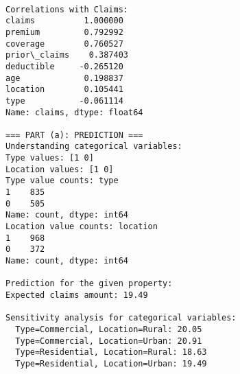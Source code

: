 \documentclass[8pt, twocolumn]{extarticle}
\begin{document}
    { \hspace*{\fill} \\}
    \begin{Verbatim}[commandchars=\\\{\}]
Correlations with Claims:
claims          1.000000
premium         0.792992
coverage        0.760527
prior\_claims    0.387403
deductible     -0.265120
age             0.198837
location        0.105441
type           -0.061114
Name: claims, dtype: float64

=== PART (a): PREDICTION ===
Understanding categorical variables:
Type values: [1 0]
Location values: [1 0]
Type value counts: type
1    835
0    505
Name: count, dtype: int64
Location value counts: location
1    968
0    372
Name: count, dtype: int64

Prediction for the given property:
Expected claims amount: 19.49

Sensitivity analysis for categorical variables:
  Type=Commercial, Location=Rural: 20.05
  Type=Commercial, Location=Urban: 20.91
  Type=Residential, Location=Rural: 18.63
  Type=Residential, Location=Urban: 19.49
    \end{Verbatim}
\end{document}
